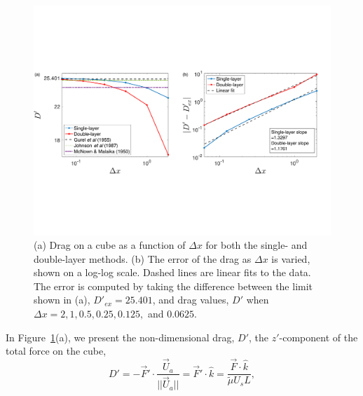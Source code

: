 \begin{figure}[ht]
	\begin{center}
		\includegraphics[scale=0.5]{figures/fig_compare_drag_error}
	\end{center}
	\caption{(a) Drag on a cube as a function of $\Delta x$ for both the single- and double-layer methods. (b) The error of the drag as $\Delta x$ is varied, shown on a log-log scale. Dashed lines are linear fits to the data. The error is computed by taking the difference between the limit shown in (a), $D'_{ex} = 25.401$, and drag values, $D'$ when $\Delta x = 2, 1, 0.5,   0.25,  0.125,$ and $0.0625$. }
	\label{fig_drag_compare}
\end{figure}
In  Figure~\ref{fig_drag_compare}(a), we present the non-dimensional drag, $D'$, the $z'$-component of the total force on the cube, 
\begin{equation}
D' = -\vec{F}' \cdot \frac{\vec{U}_a}{||\vec{U}_a||} =  \vec{F}' \cdot \hat{k} =  \frac{\vec{F} \cdot \hat{k}}{ \tilde{\mu} U_s L}, 
\label{eq_drag}
\end{equation}

